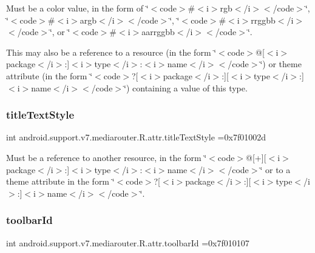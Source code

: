Must be a color value, in the form of \char`\"{}$<$code$>$\#$<$i$>$rgb$<$/i$>$$<$/code$>$\char`\"{}, \char`\"{}$<$code$>$\#$<$i$>$argb$<$/i$>$$<$/code$>$\char`\"{}, \char`\"{}$<$code$>$\#$<$i$>$rrggbb$<$/i$>$$<$/code$>$\char`\"{}, or \char`\"{}$<$code$>$\#$<$i$>$aarrggbb$<$/i$>$$<$/code$>$\char`\"{}. 

This may also be a reference to a resource (in the form \char`\"{}$<$code$>$@\mbox{[}$<$i$>$package$<$/i$>$\+:\mbox{]}$<$i$>$type$<$/i$>$\+:$<$i$>$name$<$/i$>$$<$/code$>$\char`\"{}) or theme attribute (in the form \char`\"{}$<$code$>$?\mbox{[}$<$i$>$package$<$/i$>$\+:\mbox{]}\mbox{[}$<$i$>$type$<$/i$>$\+:\mbox{]}$<$i$>$name$<$/i$>$$<$/code$>$\char`\"{}) containing a value of this type. \mbox{\label{classandroid_1_1support_1_1v7_1_1mediarouter_1_1R_1_1attr_af0515fea4fdf16c1b914b839db3e8168}} 
\subsubsection{\texorpdfstring{title\+Text\+Style}{titleTextStyle}}
{\footnotesize\ttfamily int android.\+support.\+v7.\+mediarouter.\+R.\+attr.\+title\+Text\+Style =0x7f01002d\hspace{0.3cm}{\ttfamily [static]}}

Must be a reference to another resource, in the form \char`\"{}$<$code$>$@\mbox{[}+\mbox{]}\mbox{[}$<$i$>$package$<$/i$>$\+:\mbox{]}$<$i$>$type$<$/i$>$\+:$<$i$>$name$<$/i$>$$<$/code$>$\char`\"{} or to a theme attribute in the form \char`\"{}$<$code$>$?\mbox{[}$<$i$>$package$<$/i$>$\+:\mbox{]}\mbox{[}$<$i$>$type$<$/i$>$\+:\mbox{]}$<$i$>$name$<$/i$>$$<$/code$>$\char`\"{}. \mbox{\label{classandroid_1_1support_1_1v7_1_1mediarouter_1_1R_1_1attr_a5a15482337bdff53ccc3d196da6e123f}} 
\subsubsection{\texorpdfstring{toolbar\+Id}{toolbarId}}
{\footnotesize\ttfamily int android.\+support.\+v7.\+mediarouter.\+R.\+attr.\+toolbar\+Id =0x7f010107\hspace{0.3cm}{\ttfamily [static]}}


